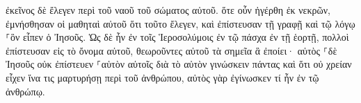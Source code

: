 \documentclass{openreader}
\begin{document}
ἐκεῖνος δὲ ἔλεγεν περὶ τοῦ ναοῦ τοῦ σώματος αὐτοῦ. 
ὅτε οὖν ἠγέρθη ἐκ νεκρῶν, ἐμνήσθησαν οἱ μαθηταὶ αὐτοῦ ὅτι τοῦτο ἔλεγεν, καὶ ἐπίστευσαν τῇ γραφῇ καὶ τῷ λόγῳ ⸀ὃν εἶπεν ὁ Ἰησοῦς. 
Ὡς δὲ ἦν ἐν τοῖς Ἱεροσολύμοις ἐν τῷ πάσχα ἐν τῇ ἑορτῇ, πολλοὶ ἐπίστευσαν εἰς τὸ ὄνομα αὐτοῦ, θεωροῦντες αὐτοῦ τὰ σημεῖα ἃ ἐποίει· 
αὐτὸς ⸀δὲ Ἰησοῦς οὐκ ἐπίστευεν ⸀αὑτὸν αὐτοῖς διὰ τὸ αὐτὸν γινώσκειν πάντας 
καὶ ὅτι οὐ χρείαν εἶχεν ἵνα τις μαρτυρήσῃ περὶ τοῦ ἀνθρώπου, αὐτὸς γὰρ ἐγίνωσκεν τί ἦν ἐν τῷ ἀνθρώπῳ. 
\end{document}
